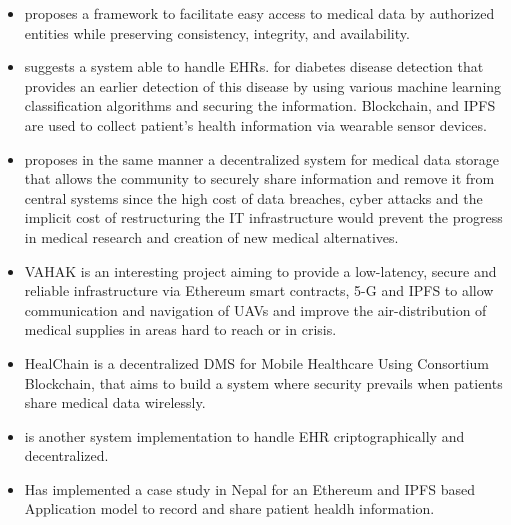 \begin{itemize}
    \item \cite{9027313} proposes a framework to facilitate easy access to medical data by authorized entities while preserving consistency, integrity, and availability.
    
    \item \cite{CHEN2021102771} suggests a system able to handle \ac{EHR}s. for diabetes disease detection that provides an earlier detection of this disease by using various machine learning classification algorithms and securing the information. Blockchain, and \ac{IPFS} are used to collect patient's health information via wearable sensor devices.
    
    \item \cite{kumar2021decentralized} proposes in the same manner a decentralized system for medical data storage that allows the community to securely share information and remove it from central systems since the high cost of data breaches, cyber attacks and the implicit cost of restructuring the \ac{IT} infrastructure would prevent the progress in medical research and creation of new medical alternatives. 
    
    \item VAHAK\cite{9162738} is an interesting project aiming to provide a low-latency, secure and reliable infrastructure via Ethereum smart contracts, 5-G and \ac{IPFS} to allow communication and navigation of \ac{UAV}s and improve the air-distribution of medical supplies in areas hard to reach or in crisis.
    
    \item HealChain\cite{8865388} is a decentralized \ac{DMS} for Mobile Healthcare Using Consortium Blockchain, that aims to build a system where security prevails when patients share medical data wirelessly.
    
    \item \cite{9066212} is another system implementation to handle \ac{EHR} criptographically and decentralized.
    
    \item \cite{9759580} Has implemented a case study in Nepal for an Ethereum and \ac{IPFS} based Application model to record and share patient healdh information.
    
\end{itemize}

